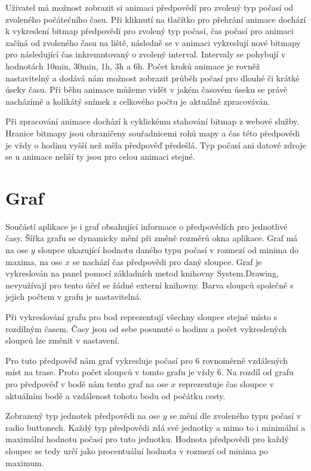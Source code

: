 \documentclass[czech,bachelor,dept460,male,csharp,cpdeclaration]{diploma}
\begin{document}
	Uživatel má možnost zobrazit si animaci předpovědí pro zvolený typ počasí od zvoleného počátečního času. Při kliknutí na tlačítko pro přehrání animace dochází k vykreslení bitmap předpovědí pro zvolený typ počasí, čas počasí pro animaci začíná od zvoleného času na liště, následně se v animaci vykreslují nové bitmapy pro následující čas inkremntovaný o zvolený interval. Intervaly se pohybují v hodnotách 10min, 30min, 1h, 3h a 6h. Počet kroků animace je rovněž nastavitelný a dodává nám možnost zobrazit průběh počasí pro dlouhé či krátké úseky času. Při běhu animace můžeme vidět v jakém časovém úseku se právě nacházímě a kolikátý snímek z celkového počtu je aktuálně zpracováván.
	
	Při zpracování animace dochází k cyklickému stahování bitmap z webové služby. Hranice bitmapy jsou ohraničeny souřadnicemi rohů mapy a čas této předpovědi je vždy o hodinu vyšší než měla předpověď předešlá. Typ počasí ani datové zdroje se u animace neliší ty jsou pro celou animaci stejné.
	
	\section{Graf}
	
	Součástí aplikace je i graf obsahující informace o předpovědích pro jednotlivé časy. Šířka grafu se dynamicky mění při změně rozměrů okna aplikace. Graf má na ose $y$ sloupce ukazující hodnotu daného typu počasí v rozmezí od minima do maxima, na ose $x$ se nachází čas předpovědi pro daný sloupce. Graf je vykreslován na panel pomocí základních metod knihovny System.Drawing, nevyužívají pro tento účel se žádné externí knihovny. Barva sloupců společně s jejich počtem v grafu je nastavitelná.
	
	Při vykreslování grafu pro bod reprezentují všechny sloupce stejné místo s rozdílným časem. Časy jsou od sebe posunuté o hodinu a počet vykreslených sloupců lze změnit v nastavení.
	
	Pro tuto předpověď nám graf vykresluje počasí pro 6 rovnoměrně vzdálených míst na trase. Proto počet sloupců v tomto grafu je vždy 6. Na rozdíl od grafu pro předpověď v bodě nám tento graf na ose $x$ reprezentuje čas sloupce v aktuálním bodě a vzdálenost tohoto bodu od počátku cesty.
	
	Zobrazený typ jednotek předpovědi na ose $y$ se mění dle zvoleného typu počasí v radio buttonech. Každý typ předpovědi zdá své jednotky a mimo to i minimální a maximální hodnotu počasí pro tuto jednotku. Hodnota předpovědi pro každý sloupec se tedy určí jako procentuální hodnota v rozmezí od minima po maximum.
	
\end{document}
